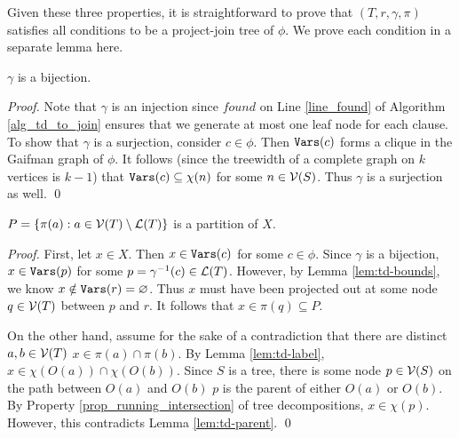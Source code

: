 

Given these three properties, it is straightforward to prove that $(T, r, \gamma, \pi)$ satisfies all conditions to be a project-join tree of $\phi$.
We prove each condition in a separate lemma here.

\begin{lemma}
    $\gamma$ is a bijection.
\end{lemma}
\begin{proof}
    Note that $\gamma$ is an injection since $found$ on Line \ref{line_found} of Algorithm \ref{alg_td_to_join} ensures that we generate at most one leaf node for each clause.
    To show that $\gamma$ is a surjection, consider $c \in \phi$.
    Then $\texttt{\upshape Vars}(c)$ forms a clique in the Gaifman graph of $\phi$.
    It follows (since the treewidth of a complete graph on $k$ vertices is $k-1$) that $\texttt{\upshape Vars}(c) \subseteq \chi(n)$ for some $n \in \mathcal{V}(S)$.
    Thus $\gamma$ is a surjection as well.
\qed
\end{proof}
\begin{lemma}
    $P = \{\pi(a) : a \in \mathcal{V}(T) \setminus \mathcal{L}(T) \}$ is a partition of $X$.
\end{lemma}
\begin{proof}
    First, let $x \in X$.
    Then $x \in \texttt{\upshape Vars}(c)$ for some $c \in \phi$.
    Since $\gamma$ is a bijection, $x \in \texttt{\upshape Vars}(p)$ for some $p = \gamma^{-1}(c) \in \mathcal{L}(T)$.
    However, by Lemma \ref{lem:td-bounds}, we know $x \notin \texttt{\upshape Vars}(r) = \varnothing$.
    Thus $x$ must have been projected out at some node $q \in \mathcal{V}(T)$ between $p$ and $r$.
    It follows that $x \in \pi(q) \subseteq P$.

    On the other hand, assume for the sake of a contradiction that there are distinct $a, b \in \mathcal{V}(T)$ \st{} $x \in \pi(a) \cap \pi(b)$.
    By Lemma \ref{lem:td-label}, $x \in \chi(O(a)) \cap \chi(O(b))$.
    Since $S$ is a tree, there is some node $p \in \mathcal{V}(S)$ on the path between $O(a)$ and $O(b)$ \st{} $p$ is the parent of either $O(a)$ or $O(b)$.
    By Property \ref{prop_running_intersection} of tree decompositions, $x \in \chi(p)$.
    However, this contradicts Lemma \ref{lem:td-parent}.
\qed
\end{proof}

